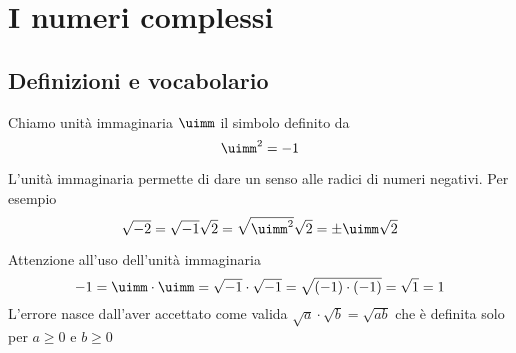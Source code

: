 \chapter{I numeri complessi}
\label{cha:INumeriComplessi}
\section{Definizioni e vocabolario}
\label{sec:NumCompDefinizioniVocabolario}
\begin{definizione}
	Chiamo unità immaginaria $\uimm$ il simbolo definito da \[\uimm^2=-1\]  
\end{definizione}
L'unità immaginaria permette di dare un senso alle radici di numeri negativi. Per esempio \[\sqrt{-2}=\sqrt{-1}\sqrt{2}=\sqrt{\uimm^2}\sqrt{2}=\pm\uimm\sqrt{2}\]
\begin{esempio}
Attenzione all'uso dell'unità immaginaria
\[-1=\uimm\cdot\uimm=\sqrt{-1}\cdot\sqrt{-1}=\sqrt{(-1)\cdot(-1)}=\sqrt{1}=1 \]L'errore nasce dall'aver accettato come valida $\sqrt{a}\cdot\sqrt{b}=\sqrt{ab}$ che è definita solo per $a\geq 0$ e $b\geq 0$
\end{esempio}
